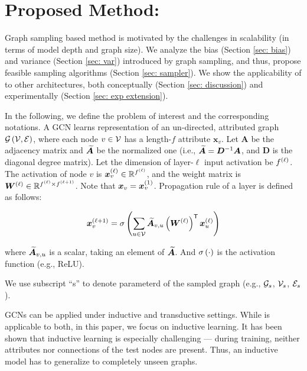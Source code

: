 \section{Proposed Method: {\graphsaint}}


Graph sampling based method is motivated by the challenges in scalability (in terms of model depth and graph size). We analyze the bias (Section \ref{sec: bias}) and variance (Section \ref{sec: var}) introduced by graph sampling, and thus, propose feasible sampling algorithms (Section \ref{sec: sampler}). 
We show the applicability of {\graphsaint} to other architectures, both conceptually (Section \ref{sec: discussion}) and experimentally (Section \ref{sec: exp extension}).

In the following, we define the problem of interest and the corresponding notations. 
A GCN learns representation of an un-directed, attributed graph $\G\paren{\V,\E}$, where each node $v\in\V$ has a length-$f$ attribute $\bm{x}_v$.
Let $\bm{A}$ be the adjacency matrix and $\Anorm$ be the normalized one (i.e., $\Anorm=\bm{D}^{-1}\bm{A}$, and $\bm{D}$ is the diagonal degree matrix). 
Let the dimension of layer-$\ell$ input activation be $f^{\left( \ell \right)}$. The activation of node $v$ is $\bm{x}_v^{\left( \ell \right)}\in\mathbb{R}^{f^{\left( \ell \right)}}$, and the weight matrix is $\W[\ell]\in\mathbb{R}^{f^{\paren{\ell}}\times f^{\paren{\ell+1}}}$. Note that $\bm{x}_v=\bm{x}_v^{\left( 1 \right)}$. 
Propagation rule of a layer is defined as follows:

\begin{equation}
\label{eq: vanilla gcn}
    \bm{x}_v^{\paren{\ell+1}} = \sigma\paren{\sum\limits_{u\in\V}\Anorm_{v,u}\paren{\W[\ell]}^{\trans} \bm{x}_u^{\paren{\ell}}}
\end{equation}

where $\Anorm_{v,u}$ is a scalar, taking an element of $\Anorm$. And $\sigma\left( \cdot \right)$ is the activation function (e.g., ReLU). 

We use subscript ``s'' to denote parameterd of the sampled graph (e.g., $\G[s]$, $\V[s]$, $\E[s]$).

GCNs can be applied under inductive and transductive settings. While {\graphsaint} is applicable to both, in this paper, we focus on inductive learning. 
It has been shown that inductive learning is especially challenging \citep{graphsage} --- during training, neither attributes nor connections of the test nodes are present. Thus, an inductive model has to generalize to completely unseen graphs. 

